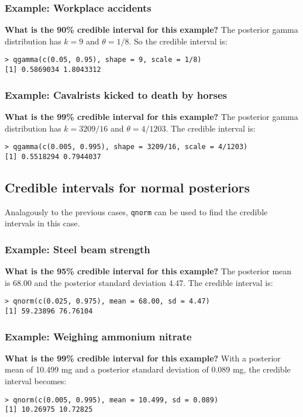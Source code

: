 \documentclass[12pt, a4paper]{article}
\begin{document}
\subsubsection{Example: Workplace accidents}
\textbf{What is the 90\% credible interval for this example?} The posterior gamma distribution has $k=9$ and $\theta=1/8$. So the credible interval is:
\begin{verbatim}
> qgamma(c(0.05, 0.95), shape = 9, scale = 1/8)
[1] 0.5869034 1.8043312
\end{verbatim}

\subsubsection{Example: Cavalrists kicked to death by horses}
\textbf{What is the 99\% credible interval for this example?}
The posterior gamma distribution has $k=3209/16$ and $\theta=4/1203$. The credible interval is:
\begin{verbatim}
> qgamma(c(0.005, 0.995), shape = 3209/16, scale = 4/1203)
[1] 0.5518294 0.7944037
\end{verbatim}

\subsection{Credible intervals for normal posteriors}
Analagously to the previous cases, \verb|qnorm| can be used to find the credible intervals in this case.

\subsubsection{Example: Steel beam strength}
\textbf{What is the 95\% credible interval for this example?} The posterior mean is 68.00 and the posterior standard deviation 4.47. The credible interval is:
\begin{verbatim}
> qnorm(c(0.025, 0.975), mean = 68.00, sd = 4.47)
[1] 59.23896 76.76104
\end{verbatim}

\subsubsection{Example: Weighing ammonium nitrate}
\textbf{What is the 99\% credible interval for this example?} With a posterior mean of 10.499 mg and a posterior standard deviation of 0.089 mg, the credible interval becomes:
\begin{verbatim}
> qnorm(c(0.005, 0.995), mean = 10.499, sd = 0.089)
[1] 10.26975 10.72825
\end{verbatim}
\end{document}
